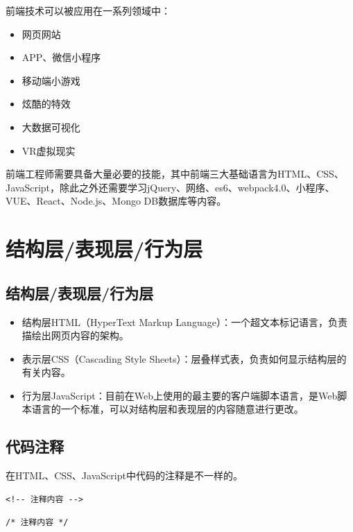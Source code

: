 前端技术可以被应用在一系列领域中：

\begin{itemize}
    \item 网页网站
    \item APP、微信小程序
    \item 移动端小游戏
    \item 炫酷的特效
    \item 大数据可视化
    \item VR虚拟现实
\end{itemize}

前端工程师需要具备大量必要的技能，其中前端三大基础语言为HTML、CSS、JavaScript，除此之外还需要学习jQuery、网络、es6、webpack4.0、小程序、VUE、React、Node.js、Mongo DB数据库等内容。 \\

\newpage

\section{结构层/表现层/行为层}

\subsection{结构层/表现层/行为层}

\begin{itemize}
    \item 结构层HTML（HyperText Markup Language）：一个超文本标记语言，负责描绘出网页内容的架构。

    \item 表示层CSS（Cascading Style Sheets）：层叠样式表，负责如何显示结构层的有关内容。

    \item 行为层JavaScript：目前在Web上使用的最主要的客户端脚本语言，是Web脚本语言的一个标准，可以对结构层和表现层的内容随意进行更改。
\end{itemize}

\subsection{代码注释}

在HTML、CSS、JavaScript中代码的注释是不一样的。

\begin{lstlisting}[style=htmlcssjs, title=HTML注释]
<!-- 注释内容 -->
\end{lstlisting}

\begin{lstlisting}[style=htmlcssjs, title=CSS注释]
/* 注释内容 */
\end{lstlisting}

